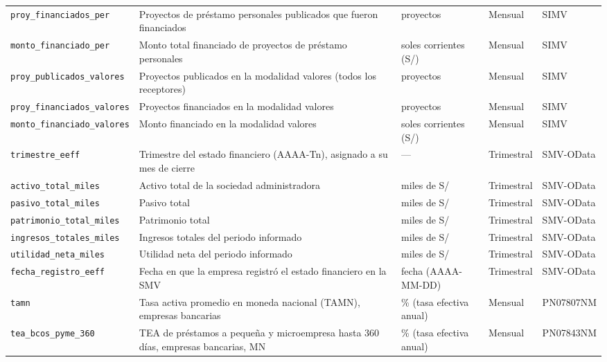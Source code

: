 {\begin{longtable}{@{}>{\RaggedRight\arraybackslash}p{4.0cm}>{\RaggedRight\arraybackslash}p{6.0cm}>{\RaggedRight\arraybackslash}p{2.3cm}>{\RaggedRight\arraybackslash}p{1.7cm}>{\RaggedRight\arraybackslash}p{1.9cm}@{}}
\texttt{proy\_\allowbreak{}financiados\_\allowbreak{}per} & Proyectos de préstamo personales publicados que fueron financiados & proyectos & Mensual & SIMV \\
\texttt{monto\_\allowbreak{}financiado\_\allowbreak{}per} & Monto total financiado de proyectos de préstamo personales & soles corrientes (S/) & Mensual & SIMV \\
\texttt{proy\_\allowbreak{}publicados\_\allowbreak{}valores} & Proyectos publicados en la modalidad valores (todos los receptores) & proyectos & Mensual & SIMV \\
\texttt{proy\_\allowbreak{}financiados\_\allowbreak{}valores} & Proyectos financiados en la modalidad valores & proyectos & Mensual & SIMV \\
\texttt{monto\_\allowbreak{}financiado\_\allowbreak{}valores} & Monto financiado en la modalidad valores & soles corrientes (S/) & Mensual & SIMV \\
\texttt{trimestre\_\allowbreak{}eeff} & Trimestre del estado financiero (AAAA-Tn), asignado a su mes de cierre & — & Trimestral & SMV-OData \\
\texttt{activo\_\allowbreak{}total\_\allowbreak{}miles} & Activo total de la sociedad administradora & miles de S/ & Trimestral & SMV-OData \\
\texttt{pasivo\_\allowbreak{}total\_\allowbreak{}miles} & Pasivo total & miles de S/ & Trimestral & SMV-OData \\
\texttt{patrimonio\_\allowbreak{}total\_\allowbreak{}miles} & Patrimonio total & miles de S/ & Trimestral & SMV-OData \\
\texttt{ingresos\_\allowbreak{}totales\_\allowbreak{}miles} & Ingresos totales del periodo informado & miles de S/ & Trimestral & SMV-OData \\
\texttt{utilidad\_\allowbreak{}neta\_\allowbreak{}miles} & Utilidad neta del periodo informado & miles de S/ & Trimestral & SMV-OData \\
\texttt{fecha\_\allowbreak{}registro\_\allowbreak{}eeff} & Fecha en que la empresa registró el estado financiero en la SMV & fecha (AAAA-MM-DD) & Trimestral & SMV-OData \\
\texttt{tamn} & Tasa activa promedio en moneda nacional (TAMN), empresas bancarias & \% (tasa efectiva anual) & Mensual & PN07807NM \\
\texttt{tea\_\allowbreak{}bcos\_\allowbreak{}pyme\_\allowbreak{}360} & TEA de préstamos a pequeña y microempresa hasta 360 días, empresas bancarias, MN & \% (tasa efectiva anual) & Mensual & PN07843NM \\

\end{longtable}}
